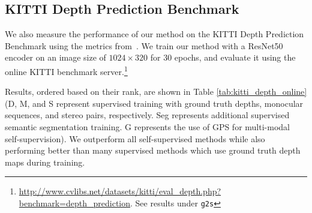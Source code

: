 \subsection{KITTI Depth Prediction Benchmark}
We also measure the performance of our method on the KITTI Depth Prediction Benchmark using the 
metrics from~\cite{Uhrig2017THREEDV}. We train our method with a ResNet50 encoder on an image size of $1024\times320$ for $30$ epochs, and evaluate it using the online KITTI benchmark server.\footnote{\url{http://www.cvlibs.net/datasets/kitti/eval_depth.php?benchmark=depth_prediction}. See results under \texttt{g2s}} 

Results, ordered based on their rank, are shown in Table \ref{tab:kitti_depth_online} (D, M, and S represent supervised training with ground truth depths, monocular sequences, and stereo pairs, respectively. Seg represents additional supervised semantic segmentation training. G represents the use of GPS for multi-modal self-supervision).  We outperform all self-supervised methods while also performing better than many supervised methods which use ground truth depth maps during training.

